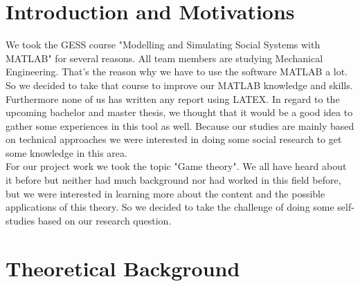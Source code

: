 \documentclass[11pt]{article}
\begin{document}
\section{Introduction and Motivations}
We took the GESS course "Modelling and Simulating Social Systems with MATLAB" for several reasons. All team members are studying Mechanical Engineering. That's the reason why we have to use the software MATLAB a lot. So we decided to take that course to improve our MATLAB knowledge and skills. Furthermore none of us has written any report using LATEX. In regard to the upcoming bachelor and master thesis, we thought that it would be a good idea to gather some experiences in this tool as well. Because our studies are mainly based on technical approaches we were interested in doing some social research to get some knowledge in this area. \\
For our project work we took the topic "Game theory". We all have heard about it before but neither had much background nor had worked in this field before, but we were interested in learning more about the content and the possible applications of this theory. So we decided to take the challenge of doing some self-studies based on our research question.

\section{Theoretical Background}
\end{document}
